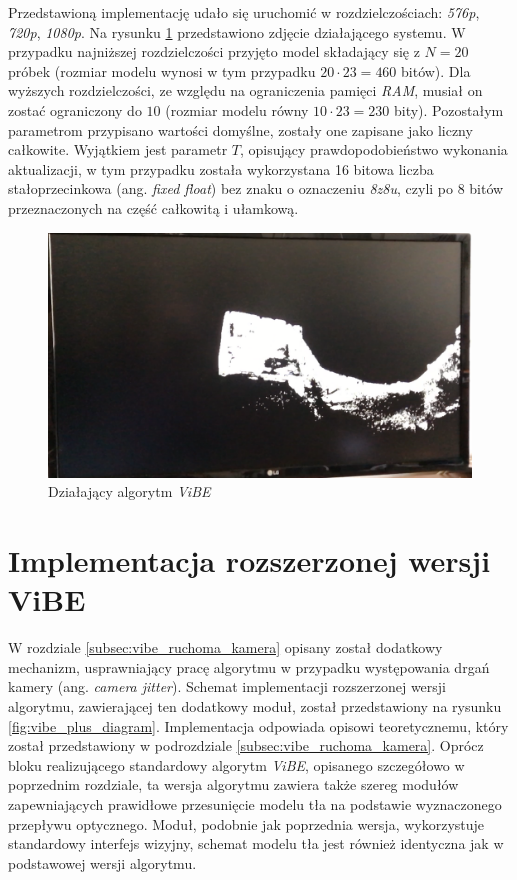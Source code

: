 Przedstawioną implementację udało się uruchomić w rozdzielczościach: \textit{576p}, \textit{720p}, \textit{1080p}. Na rysunku \ref{fig:vibe_demo} przedstawiono zdjęcie działającego systemu. W przypadku najniższej rozdzielczości przyjęto model składający się z $N=20$ próbek (rozmiar modelu wynosi w tym przypadku $20 \cdot 23=460$ bitów). Dla wyższych rozdzielczości, ze względu na ograniczenia pamięci \textit{RAM}, musiał on zostać ograniczony do $10$ (rozmiar modelu równy $10 \cdot 23=230$ bity). Pozostałym parametrom przypisano wartości domyślne, zostały one zapisane jako liczny całkowite. Wyjątkiem jest parametr $T$, opisujący prawdopodobieństwo wykonania aktualizacji, w tym przypadku została wykorzystana 16 bitowa liczba stałoprzecinkowa (ang. \textit{fixed float}) bez znaku o oznaczeniu \textit{8z8u}, czyli po 8 bitów przeznaczonych na część całkowitą i ułamkową.

	\begin{figure}[h!]
		\centering
		\includegraphics[scale=0.2]{img/4/vibe_example.png}
		\caption{Działający algorytm \textit{ViBE}}
		\label{fig:vibe_demo}
	\end{figure}	
	
	
\section{Implementacja rozszerzonej wersji ViBE}
\label{sec:fpga_vibe_plus}

W rozdziale \ref{subsec:vibe_ruchoma_kamera} opisany został dodatkowy mechanizm, usprawniający pracę algorytmu w przypadku występowania drgań kamery (ang. \textit{camera jitter}). Schemat implementacji rozszerzonej wersji algorytmu, zawierającej ten dodatkowy moduł, został przedstawiony na rysunku \ref{fig:vibe_plus_diagram}. Implementacja odpowiada opisowi teoretycznemu, który został przedstawiony w podrozdziale \ref{subsec:vibe_ruchoma_kamera}. Oprócz bloku realizującego standardowy algorytm \textit{ViBE}, opisanego szczegółowo w poprzednim rozdziale, ta wersja algorytmu zawiera także szereg modułów zapewniających prawidłowe przesunięcie modelu tła na podstawie wyznaczonego przepływu optycznego. Moduł, podobnie jak poprzednia wersja, wykorzystuje standardowy interfejs wizyjny, schemat modelu tła jest również identyczna jak w podstawowej wersji algorytmu. 
	
